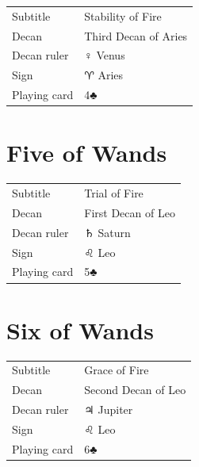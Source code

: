 \begin{center}
\end{center}

\vspace{4mm}
\noindent\begin{tabular}{@{}l@{\quad}l@{}}
Subtitle & Stability of Fire \\
Decan & Third Decan of Aries \\
Decan ruler & {\symbfont ♀} Venus \\
Sign & {\symbfont ♈} Aries \\
Playing card & 4♣ \\
\end{tabular}

\newpage
\section*{Five of Wands}

\begin{center}
\end{center}

\vspace{4mm}
\noindent\begin{tabular}{@{}l@{\quad}l@{}}
Subtitle & Trial of Fire \\
Decan & First Decan of Leo \\
Decan ruler & {\symbfont ♄} Saturn \\
Sign & {\symbfont ♌} Leo \\
Playing card & 5♣ \\
\end{tabular}

\newpage
\section*{Six of Wands}

\begin{center}
\end{center}

\vspace{4mm}
\noindent\begin{tabular}{@{}l@{\quad}l@{}}
Subtitle & Grace of Fire \\
Decan & Second Decan of Leo \\
Decan ruler & {\symbfont ♃} Jupiter \\
Sign & {\symbfont ♌} Leo \\
Playing card & 6♣ \\
\end{tabular}

